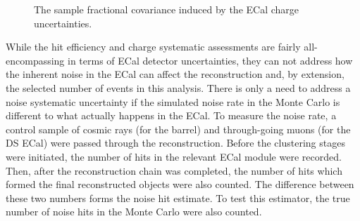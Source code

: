 \begin{figure}%
  \centering
  \caption{The sample fractional covariance induced by the ECal charge uncertainties.}
  \label{fig:ECalChargeCovarianceMatrices}
\end{figure}
\newline
\newline
While the hit efficiency and charge systematic assessments are fairly all-encompassing in terms of ECal detector uncertainties, they can not address how the inherent noise in the ECal can affect the reconstruction and, by extension, the selected number of events in this analysis.  There is only a need to address a noise systematic uncertainty if the simulated noise rate in the Monte Carlo is different to what actually happens in the ECal.  
\newline
\newline
To measure the noise rate, a control sample  of cosmic rays (for the barrel) and through-going muons (for the DS ECal) were passed through the reconstruction.  Before the clustering stages were initiated, the number of hits in the relevant ECal module were recorded.  Then, after the reconstruction chain was completed, the number of hits which formed the final reconstructed objects were also counted.  The difference between these two numbers forms the noise hit estimate.  To test this estimator, the true number of noise hits in the Monte Carlo were also counted.
